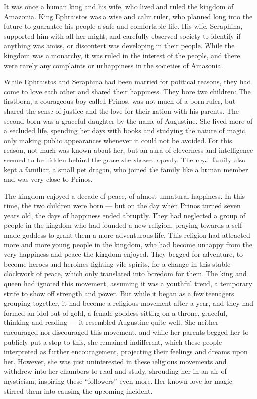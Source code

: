 It was once a human king and his wife, who lived and ruled the kingdom of Amazonia. King Ephraistos was a wise and calm ruler, who planned long into the future to guarantee his people a safe and comfortable life. His wife, Seraphina, supported him with all her might, and carefully observed society to identify if anything was amiss, or discontent was developing in their people. While the kingdom was a monarchy, it was ruled in the interest of the people, and there were rarely any complaints or unhappiness in the societies of Amazonia.

While Ephraistos and Seraphina had been married for political reasons, they had come to love each other and shared their happiness. They bore two children: The firstborn, a courageous boy called Prinos, was not much of a born ruler, but shared the sense of justice and the love for their nation with his parents. The second born was a graceful daughter by the name of Augustine. She lived more of a secluded life, spending her days with books and studying the nature of magic, only making public appearances whenever it could not be avoided. For this reason, not much was known about her, but an aura of cleverness and intelligence seemed to be hidden behind the grace she showed openly. The royal family also kept a familiar, a small pet dragon, who joined the family like a human member and was very close to Prinos.

The kingdom enjoyed a decade of peace, of almost unnatural happiness. In this time, the two children were born --- but on the day when Prinos turned seven years old, the days of happiness ended abruptly. They had neglected a group of people in the kingdom who had founded a new religion, praying towards a self-made goddess to grant them a more adventurous life. This religion had attracted more and more young people in the kingdom, who had become unhappy from the very happiness and peace the kingdom enjoyed. They begged for adventure, to become heroes and heroines fighting vile spirits, for a change in this stable clockwork of peace, which only translated into boredom for them. The king and queen had ignored this movement, assuming it was a youthful trend, a temporary strife to show off strength and power. But while it began as a few teenagers grouping together, it had become a religious movement after a year, and they had formed an idol out of gold, a female goddess sitting on a throne, graceful, thinking and reading --- it resembled Augustine quite well. She neither encouraged nor discouraged this movement, and while her parents begged her to publicly put a stop to this, she remained indifferent, which these people interpreted as further encouragement, projecting their feelings and dreams upon her. However, she was just uninterested in these religious movements and withdrew into her chambers to read and study, shrouding her in an air of mysticism, inspiring these \enquote{followers} even more. Her known love for magic stirred them into causing the upcoming incident.

